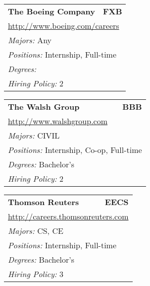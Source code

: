 \documentclass[twoside]{article}
\begin{document}
\begin{center}
\begin{multicols}{3}
\begin{FlushLeft}
\begin{minipage}{.9\columnwidth}
\end{minipage}
 
\begin{minipage}{.9\columnwidth}\begin{tabularx}{.95\columnwidth}{Xr}
                 {\Large\bf The Boeing Company} & {\Large\bf FXB}\\
    \multicolumn{2}{p{.95\columnwidth}}{\url{http://www.boeing.com/careers}}\\
    \multicolumn{2}{p{.95\columnwidth}}{\emph{Majors:} Any}\\
    \multicolumn{2}{p{.95\columnwidth}}{\emph{Positions:} Internship, Full-time}\\
    \multicolumn{2}{p{.95\columnwidth}}{\emph{Degrees:} }\\
    \multicolumn{2}{p{.95\columnwidth}}{\emph{Hiring Policy:} 2}\\
    \end{tabularx}
    
\end{minipage}
 
\begin{minipage}{.9\columnwidth}\begin{tabularx}{.95\columnwidth}{Xr}
                 {\Large\bf The Walsh Group} & {\Large\bf BBB}\\
    \multicolumn{2}{p{.95\columnwidth}}{\url{http://www.walshgroup.com}}\\
    \multicolumn{2}{p{.95\columnwidth}}{\emph{Majors:} CIVIL}\\
    \multicolumn{2}{p{.95\columnwidth}}{\emph{Positions:} Internship, Co-op, Full-time}\\
    \multicolumn{2}{p{.95\columnwidth}}{\emph{Degrees:} Bachelor's}\\
    \multicolumn{2}{p{.95\columnwidth}}{\emph{Hiring Policy:} 2}\\
    \end{tabularx}
    
\end{minipage}
 
\begin{minipage}{.9\columnwidth}\begin{tabularx}{.95\columnwidth}{Xr}
                 {\Large\bf Thomson Reuters} & {\Large\bf EECS}\\
    \multicolumn{2}{p{.95\columnwidth}}{\url{http://careers.thomsonreuters.com}}\\
    \multicolumn{2}{p{.95\columnwidth}}{\emph{Majors:} CS, CE}\\
    \multicolumn{2}{p{.95\columnwidth}}{\emph{Positions:} Internship, Full-time}\\
    \multicolumn{2}{p{.95\columnwidth}}{\emph{Degrees:} Bachelor's}\\
    \multicolumn{2}{p{.95\columnwidth}}{\emph{Hiring Policy:} 3}\\
    \end{tabularx}
    

\end{minipage}
\end{FlushLeft}
\end{multicols}
\end{center}
\end{document}
